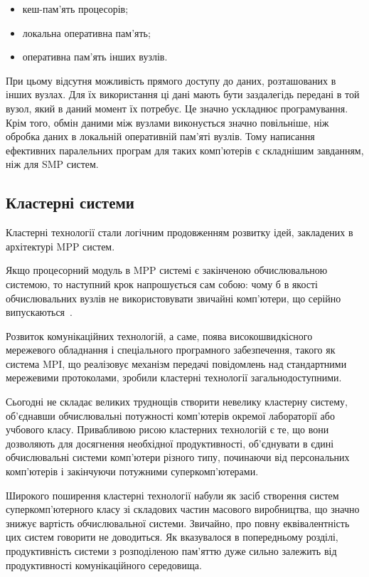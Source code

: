 \begin{itemize}
\item кеш-пам'ять процесорів;
\item локальна оперативна пам'ять;
\item оперативна пам'ять інших вузлів.
\end{itemize}

При цьому відсутня можливість прямого доступу до даних, розташованих в інших вузлах. Для їх використання ці дані мають бути заздалегідь передані в той вузол, який в даний момент їх потребує. Це значно ускладнює програмування. Крім того, обмін даними між вузлами виконується значно повільніше, ніж обробка даних в локальній оперативній пам'яті вузлів. Тому написання ефективних паралельних програм для таких комп'ютерів є складнішим завданням, ніж для SMP систем.

\subsection{Кластерні системи}

Кластерні технології стали логічним продовженням розвитку ідей, закладених в архітектурі MPP систем. 

Якщо процесорний модуль в MPP системі є закінченою обчислювальною системою, то наступний крок напрошується сам собою: чому б в якості обчислювальних вузлів не використовувати звичайні комп'ютери, що серійно випускаються~\cite{beowulf}.  

Розвиток комунікаційних технологій, а саме, поява високошвидкісного мережевого обладнання і спеціального програмного забезпечення, такого як система MPI, що реалізовує механізм передачі повідомлень над стандартними мережевими протоколами, зробили кластерні технології загальнодоступними.  

Сьогодні не складає великих труднощів створити невелику кластерну систему, об'єднавши обчислювальні потужності комп'ютерів окремої лабораторії або учбового класу. Привабливою рисою кластерних технологій є те, що вони дозволяють для досягнення необхідної продуктивності, об'єднувати в єдині обчислювальні системи комп'ютери різного типу, починаючи від персональних комп'ютерів і закінчуючи потужними суперкомп'ютерами.

Широкого поширення кластерні технології набули як засіб створення систем суперкомп'ютерного класу зі складових частин масового виробництва, що значно знижує вартість обчислювальної системи. Звичайно, про повну еквівалентність цих систем говорити не доводиться. Як вказувалося в попередньому розділі, продуктивність системи з розподіленою пам'яттю дуже сильно залежить від продуктивності комунікаційного середовища.
 
